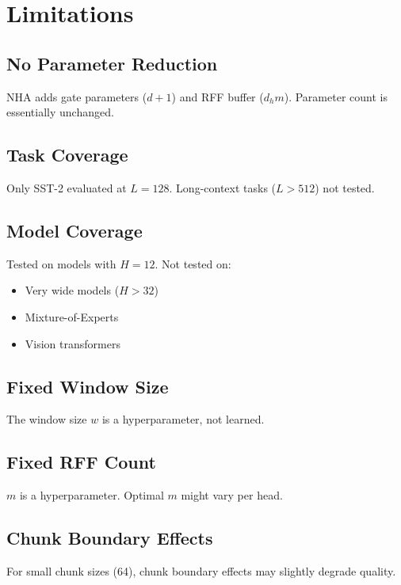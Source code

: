
\section{Limitations}

\subsection{No Parameter Reduction}

NHA adds gate parameters ($d + 1$) and RFF buffer ($d_h m$). Parameter 
count is essentially unchanged.

\subsection{Task Coverage}

Only SST-2 evaluated at $L = 128$. Long-context tasks ($L > 512$) not tested.

\subsection{Model Coverage}

Tested on models with $H = 12$. Not tested on:
\begin{itemize}
\item Very wide models ($H > 32$)
\item Mixture-of-Experts
\item Vision transformers

\end{itemize}
\subsection{Fixed Window Size}

The window size $w$ is a hyperparameter, not learned.

\subsection{Fixed RFF Count}

$m$ is a hyperparameter. Optimal $m$ might vary per head.

\subsection{Chunk Boundary Effects}

For small chunk sizes (64), chunk boundary effects may slightly degrade 
quality.

